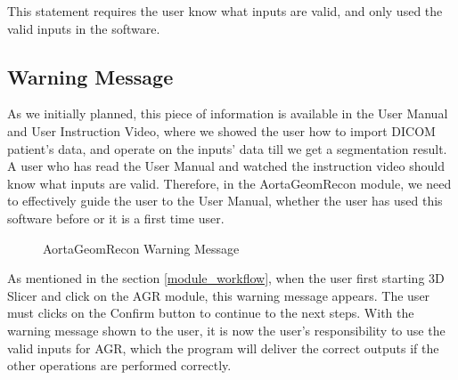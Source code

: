 This statement requires the user know what inputs are valid, and only used the valid inputs in the software.

\subsection{Warning Message}

As we initially planned, this piece of information is available in the User Manual and User Instruction Video, where we showed the user how to import DICOM patient's data, and operate on the inputs' data till we get a segmentation result. A user who has read the User Manual and watched the instruction video should know what inputs are valid. Therefore, in the AortaGeomRecon module, we need to effectively guide the user to the User Manual, whether the user has used this software before or it is a first time user.

\begin{figure}[H]
    \centering
    \caption[AortaGeomRecon Warning Message]{AortaGeomRecon Warning Message}
    \label{fig_agr_ac_wm}
\end{figure}

As mentioned in the section \ref{module_workflow}, when the user first starting 3D Slicer and click on the AGR module, this warning message appears. The user must clicks on the Confirm button to continue to the next steps. With the warning message shown to the user, it is now the user's responsibility to use the valid inputs for AGR, which the program will deliver the correct outputs if the other operations are performed correctly. 

%
